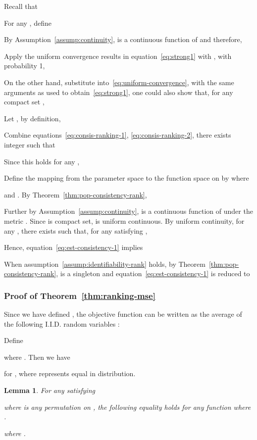 \documentclass[11pt,a4paper]{article}
\newtheorem{lemma}{Lemma}[section]
\begin{document}
Recall that 

For any , define 

By Assumption~\ref{assump:continuity},  is a continuous function of  and therefore, 

Apply the uniform convergence results in equation~\eqref{eq:strong1} with , with probability 1, 

On the other hand, substitute  into~\eqref{eq:uniform-convergence}, with the same arguments as used to obtain~\eqref{eq:strong1}, one could also show that, for any compact set ,

Let , by definition, 

Combine equations~\eqref{eq:consis-ranking-1}, \eqref{eq:consis-ranking-2}, there exists integer  such that 

Since this holds for any ,  

Define the mapping  from the parameter space  to the function space on  by  where

and . 
By Theorem~\ref{thm:pop-consistency-rank}, 

Further by Assumption~\ref{assump:continuity},  is a continuous function of  under the metric . Since  is compact set,  is uniform continuous. By uniform continuity, for any , there exists  such that, for any  satisfying , 

Hence, equation~\eqref{eq:est-consistency-1} implies

When assumption~\ref{assump:identifiability-rank} holds, by Theorem~\ref{thm:pop-consistency-rank},   is a singleton and equation~\eqref{eq:est-consistency-1} is reduced to


\subsubsection{Proof of Theorem~\ref{thm:ranking-mse}}
\label{sec:pf-ranking-mse}
Since we have defined , the objective function  can be written as the average of the following I.I.D. random variables :  

Define 

where . Then we have 


for , where  represents equal in distribution. 

\begin{lemma}
For any  satisfying  

where  is any permutation on , the following equality holds for any function 
 where .

where . 
\label{lem:integral-rank}
\end{lemma}
\end{document}
